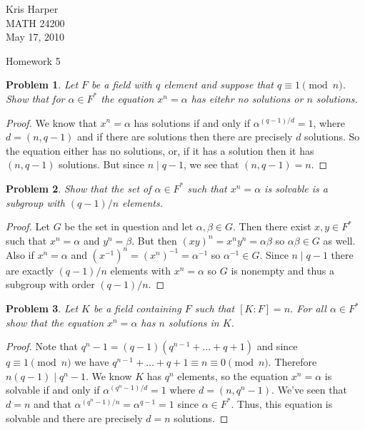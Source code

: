 \documentclass{article}
\newtheorem{problem}{Problem}
\begin{document}
\begin{flushright}
Kris Harper\\

MATH 24200\\

May 17, 2010
\end{flushright}

\begin{center}
Homework 5
\end{center}

\begin{problem}
Let $F$ be a field with $q$ element and suppose that $q \equiv 1 \pmod{n}$. Show that for $\alpha \in F^*$ the equation $x^n = \alpha$ has eitehr no solutions or $n$ solutions.
\end{problem}
\begin{proof}
We know that $x^n = \alpha$ has solutions if and only if $\alpha^{(q-1)/d} = 1$, where $d = (n,q-1)$ and if there are solutions then there are precisely $d$ solutions. So the equation either has no solutions, or, if it has a solution then it has $(n,q-1)$ solutions. But since $n \mid q-1$, we see that $(n,q-1) = n$.
\end{proof}

\begin{problem}
Show that the set of $\alpha \in F^*$ such that $x^n = \alpha$ is solvable is a subgroup with $(q-1)/n$ elements.
\end{problem}
\begin{proof}
Let $G$ be the set in question and let $\alpha, \beta \in G$. Then there exist $x,y \in F^*$ such that $x^n = \alpha$ and $y^n = \beta$. But then $(xy)^n = x^ny^n = \alpha \beta$ so $\alpha \beta \in G$ as well. Also if $x^n = \alpha$ and $(x^{-1})^n = (x^n)^{-1} = \alpha^{-1}$ so $\alpha^{-1} \in G$. Since $n \mid q-1$ there are exactly $(q-1)/n$ elements with $x^n = \alpha$ so $G$ is nonempty and thus a subgroup with order $(q-1)/n$.
\end{proof}

\begin{problem}
Let $K$ be a field containing $F$ such that $[K:F] = n$. For all $\alpha \in F^*$ show that the equation $x^n = \alpha$ has $n$ solutions in $K$.
\end{problem}
\begin{proof}
Note that $q^n - 1 = (q-1)(q^{n-1} + \dots + q + 1)$ and since $q \equiv 1 \pmod{n}$ we have $q^{n-1} + \dots + q + 1 \equiv n \equiv 0 \pmod{n}$. Therefore $n(q-1) \mid q^n - 1$. We know $K$ has $q^n$ elements, so the equation $x^n = \alpha$ is solvable if and only if $\alpha^{(q^n-1)/d} = 1$ where $d = (n,q^n-1)$. We've seen that $d = n$ and that $\alpha^{(q^n-1)/n}= \alpha^{q-1} = 1$ since $\alpha \in F^*$. Thus, this equation is solvable and there are precisely $d = n$ solutions.
\end{proof}
\end{document}
